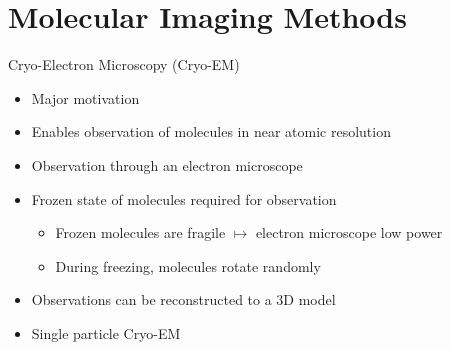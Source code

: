 
\section{Molecular Imaging Methods}	%

\begin{frame}[c]{Cryo-Electron Microscopy (Cryo-EM)}
    \begin{itemize}
        \item Major motivation
        \item Enables observation of molecules in near atomic resolution
        \item<2-> Observation through an electron microscope
        \item<2-> Frozen state of molecules required for observation
        \begin{itemize}
            \item<2-> Frozen molecules are fragile $\mapsto$ electron microscope low power
            \item<2-> During freezing, molecules rotate randomly
        \end{itemize}
        \item<2-> Observations can be reconstructed to a 3D model
        \item<2-> Single particle Cryo-EM 
    \end{itemize}
\end{frame}

